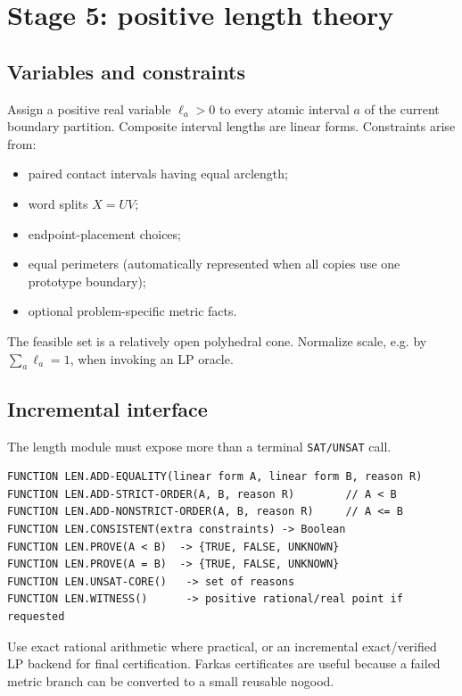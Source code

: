 \documentclass[11pt]{article}
\begin{document}
\section{Stage 5: positive length theory}
\label{sec:length}

\subsection{Variables and constraints}

Assign a positive real variable $\ell_a>0$ to every atomic interval $a$ of the current boundary partition.  Composite interval lengths are linear forms.  Constraints arise from:
\begin{itemize}
  \item paired contact intervals having equal arclength;
  \item word splits $X=UV$;
  \item endpoint-placement choices;
  \item equal perimeters (automatically represented when all copies use one prototype boundary);
  \item optional problem-specific metric facts.
\end{itemize}
The feasible set is a relatively open polyhedral cone.  Normalize scale, e.g. by $\sum_a \ell_a=1$, when invoking an LP oracle.

\subsection{Incremental interface}

The length module must expose more than a terminal \texttt{SAT/UNSAT} call.

\begin{lstlisting}[caption={Length-theory abstract interface.}]
FUNCTION LEN.ADD-EQUALITY(linear form A, linear form B, reason R)
FUNCTION LEN.ADD-STRICT-ORDER(A, B, reason R)        // A < B
FUNCTION LEN.ADD-NONSTRICT-ORDER(A, B, reason R)     // A <= B
FUNCTION LEN.CONSISTENT(extra constraints) -> Boolean
FUNCTION LEN.PROVE(A < B)  -> {TRUE, FALSE, UNKNOWN}
FUNCTION LEN.PROVE(A = B)  -> {TRUE, FALSE, UNKNOWN}
FUNCTION LEN.UNSAT-CORE()   -> set of reasons
FUNCTION LEN.WITNESS()      -> positive rational/real point if requested
\end{lstlisting}

Use exact rational arithmetic where practical, or an incremental exact/verified LP backend for final certification.  Farkas certificates are useful because a failed metric branch can be converted to a small reusable nogood.
\end{document}
